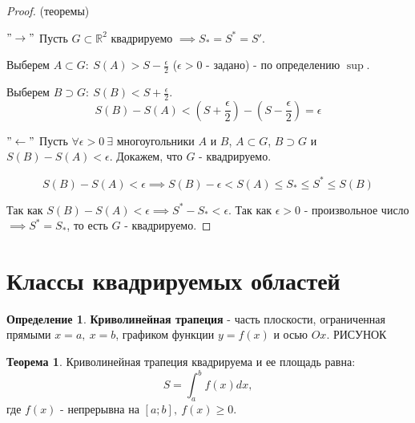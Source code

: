 \documentclass{report}
\theoremstyle{definition}
\newtheorem{definition}{Определение}[section]
\newtheorem{theorem}{Теорема}[section]
\begin{document}
\begin{proof}
  (теоремы)

  $" \rightarrow "$ Пусть $G \subset \mathbb{R}^2$ квадрируемо $\implies S_* = S^* = S'$.

  Выберем $A\subset G: \ S(A) > S - \frac{\epsilon}{2}$ ($\epsilon>0$ - задано) - по определению $\sup$.

  Выберем $B\supset G: \ S(B) < S + \frac{\epsilon}{2}$.
  \begin{equation*}
    S(B) - S(A) < (S + \frac{\epsilon}{2}) - (S - \frac{\epsilon}{2}) = \epsilon
  \end{equation*}

  $" \leftarrow "$ Пусть $\forall \epsilon > 0 \ \exists$ многоугольники $A$ и $B$, $A \subset G$,
  $B \supset G$ и $S(B) - S(A) < \epsilon$. Докажем, что $G$ - квадрируемо.

  \begin{equation*}
    S(B) - S(A) < \epsilon \implies S(B) - \epsilon < S(A) \leqslant S_* \leqslant S^* \leqslant S(B)
  \end{equation*}

  Так как $S(B) - S(A) < \epsilon \implies S^* - S_* < \epsilon$. Так как $\epsilon > 0$ - произвольное число
  $\implies S^* = S_*$, то есть $G$ - квадрируемо.
\end{proof}

\section{Классы квадрируемых областей}

\begin{definition}
  \textbf{Криволинейная трапеция} - часть плоскости, ограниченная прямыми $x=a, \ x=b$, графиком функции
  $y = f(x)$ и осью $Ox$. {\Large РИСУНОК}
\end{definition}

\begin{theorem}
  Криволинейная трапеция квадрируема и ее площадь равна:
  \begin{equation*}
    S = \int_{a}^{b}f(x)dx,
  \end{equation*}
  где $f(x)$ - непрерывна на $[a;b], \ f(x) \geqslant 0$.
\end{theorem}
\end{document}

